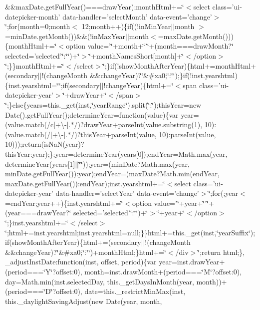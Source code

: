 {{\begin{DoxyParamCaption}
\&\&max\+Date.\+get\+Full\+Year()===draw\+Year);month\+Html+=\char`\"{}$<$select class='ui-\/datepicker-\/month' data-\/handler='select\+Month' data-\/event='change'$>$\char`\"{};for(month=0;month$<$ 12;month++)\{if((!in\+Min\+Year$\vert$$\vert$month $>$=min\+Date.\+get\+Month())\&\&(!in\+Max\+Year$\vert$$\vert$month$<$=max\+Date.\+get\+Month()))\{month\+Html+=\char`\"{}$<$option value='\char`\"{}+month+\char`\"{}'\char`\"{}+(month===draw\+Month?\char`\"{} selected='selected'\char`\"{}\+:\char`\"{}\char`\"{})+\char`\"{}$>$\char`\"{}+month\+Names\+Short\mbox{[}month\mbox{]}+\char`\"{}$<$/option$>$\char`\"{};\}\}month\+Html+=\char`\"{}$<$/select$>$\char`\"{};\}if(!show\+Month\+After\+Year)\{html+=month\+Html+(secondary$\vert$$\vert$!(change\+Month \&\&change\+Year)?\char`\"{}\&\#xa0;\char`\"{}\+:\char`\"{}\char`\"{});\}if(!inst.\+yearshtml)\{inst.\+yearshtml=\char`\"{}\char`\"{};if(secondary$\vert$$\vert$!change\+Year)\{html+=\char`\"{}$<$span class='ui-\/datepicker-\/year'$>$\char`\"{}+draw\+Year+\char`\"{}$<$/span$>$\char`\"{};\}else\{years=this.\+\_\+get(inst,\char`\"{}year\+Range\char`\"{}).\+split(\char`\"{}\+:\char`\"{});this\+Year=new Date().\+get\+Full\+Year();determine\+Year=function(value)\{var year=(value.\+match(/c\mbox{[}+\textbackslash{}-\/\mbox{]}.$\ast$/)?draw\+Year+parse\+Int(value.\+substring(1), 10)\+:(value.\+match(/\mbox{[}+\textbackslash{}-\/\mbox{]}.$\ast$/)?this\+Year+parse\+Int(value, 10)\+:parse\+Int(value, 10)));return(is\+Na\+N(year)?this\+Year\+:year);\};year=determine\+Year(years\mbox{[}0\mbox{]});end\+Year=\+Math.\+max(year, determine\+Year(years\mbox{[}1\mbox{]}$\vert$$\vert$\char`\"{}\char`\"{}));year=(min\+Date?\+Math.\+max(year, min\+Date.\+get\+Full\+Year())\+:year);end\+Year=(max\+Date?\+Math.\+min(end\+Year, max\+Date.\+get\+Full\+Year())\+:end\+Year);inst.\+yearshtml+=\char`\"{}$<$select class='ui-\/datepicker-\/year' data-\/handler='select\+Year' data-\/event='change'$>$\char`\"{};for(;year$<$=end\+Year;year++)\{inst.\+yearshtml+=\char`\"{}$<$option value='\char`\"{}+year+\char`\"{}'\char`\"{}+(year===draw\+Year?\char`\"{} selected='selected'\char`\"{}\+:\char`\"{}\char`\"{})+\char`\"{}$>$\char`\"{}+year+\char`\"{}$<$/option$>$\char`\"{};\}inst.\+yearshtml+=\char`\"{}$<$/select$>$\char`\"{};html+=inst.\+yearshtml;inst.\+yearshtml=null;\}\}html+=this.\+\_\+get(inst,\char`\"{}year\+Suffix\char`\"{});if(show\+Month\+After\+Year)\{html+=(secondary$\vert$$\vert$!(change\+Month \&\&change\+Year)?\char`\"{}\&\#xa0;\char`\"{}\+:\char`\"{}\char`\"{})+month\+Html;\}html+=\char`\"{}$<$/div$>$\char`\"{};return html;\}, \+\_\+adjust\+Inst\+Date\+:function(inst, offset, period)\{var year=inst.\+draw\+Year+(period===\char`\"{}\+Y\char`\"{}?offset\+:0), month=inst.\+draw\+Month+(period===\char`\"{}\+M\char`\"{}?offset\+:0), day=\+Math.\+min(inst.\+selected\+Day, this.\+\_\+get\+Days\+In\+Month(year, month))+(period===\char`\"{}\+D\char`\"{}?offset\+:0), date=this.\+\_\+restrict\+Min\+Max(inst, this.\+\_\+daylight\+Saving\+Adjust(new Date(year, month, 
\end{DoxyParamCaption}}}
